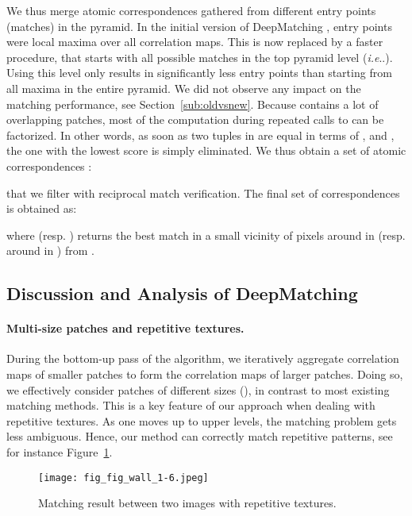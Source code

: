 \documentclass[twocolumn,natbib]{svjour3}
\makeatletter
\DeclareRobustCommand\onedot{\futurelet\@let@token\@onedot}
\def\@onedot{\ifx\@let@token.\else.\null\fi\xspace}
\def\ie{\emph{i.e}\onedot} \def\Ie{\emph{I.e}\onedot}
\newcommand{\red}[1]{{\color{black}{#1}}}
\makeatother
\begin{document}
We thus merge atomic correspondences gathered from different entry points (matches) in the pyramid. 
In the initial version of DeepMatching \citep{DeepFlow}, entry points
were local maxima over all correlation maps. This is now replaced by 
a faster procedure, that starts with all possible matches in the top
pyramid level  
(\ie  ).
Using this level only results in significantly less entry points than
starting from all maxima in the entire pyramid.
We did not observe any impact on the matching performance, see Section~\ref{sub:oldvsnew}.
Because  contains a lot of overlapping patches, most of the computation
during repeated calls to  can be factorized. In other words, as soon as two tuples in 
are equal in terms of ,  and , 
the one with the lowest score is simply eliminated.
We thus obtain a set of atomic correspondences :

that we filter with reciprocal match verification. 
The final set of correspondences  is obtained as: 

where  (resp.  ) returns the best match
in a small vicinity of  pixels around  in  (resp. around  in )  from .


\subsection{Discussion and Analysis of DeepMatching}
\label{sub:analysis}


\paragraph{Multi-size patches and repetitive textures.}

During the bottom-up pass of the algorithm, we iteratively aggregate
correlation maps of smaller patches to form the correlation maps of
larger patches. Doing so, we effectively consider patches of 
different sizes (), in contrast to most existing matching methods. 
This is a key feature of our approach when
dealing with repetitive textures. As one moves up to upper levels,
the matching problem gets less ambiguous. Hence, 
our method can correctly match repetitive patterns, see for instance Figure~\ref{fig:repet}.


\begin{figure}
  \centering
  \texttt{[image: fig\_fig\_wall\_1-6.jpeg]}
  \caption{Matching result between two images with repetitive
    textures. \red{Nearly all output correspondences are correct. 
    Wrong matches are due to occluded areas (bottom-right of the first image) or situations where the 
    deformation tolerance of DeepMatching is exceeded (bottom-left of the first image).} }
  \label{fig:repet}
\end{figure}
\end{document}

